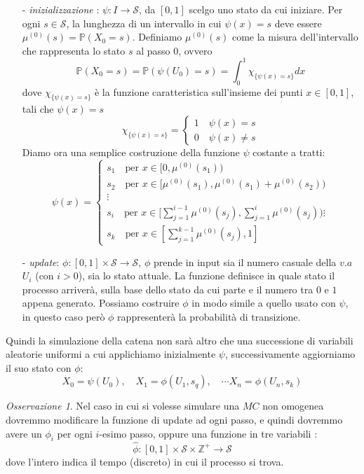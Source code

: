 \documentclass{article}
\theoremstyle{definition}
\theoremstyle{remark}
\newtheorem{remark}[theorem]{Osservazione}
\begin{document}
\begin{itemize}
    \item[-] \textit{inizializzazione} : $\psi : I\to \mathcal{S}$, da $[0,1]$ scelgo uno stato da cui iniziare.
          Per ogni $s\in\mathcal{S}$, la lunghezza di un intervallo in cui $\psi(x)=s$ deve essere $\mu^{(0)}(s) =\mathbb{P}(X_0 = s) $.
          Definiamo $\mu^{(0)}(s)$ come la misura dell'intervallo che rappresenta lo stato $s$ al passo $0$, ovvero
          $$ \mathbb{P}(X_0 = s) = \mathbb{P}(\psi(U_0)=s) = \int_0^1 \chi_{\{\psi(x)=s\}} dx$$
          dove $\chi_{\{\psi(x) = s\}}$ è la funzione caratteristica sull'insieme dei punti  $x\in [0,1]$, tali che $\psi(x) = s$
          $$\chi_{\{\psi(x) = s\}} =\left\{ \begin{array}{cl} 1 \quad \psi(x) = s\\ 0 \quad \psi(x) \neq s\end{array} \right.$$
          Diamo ora una semplice costruzione della funzione $\psi$ costante a tratti:
          $$\psi(x)= \begin{cases}

                  s_1 \quad \text{per $x\in [0,\mu^{(0)}(s_1))$}                             \\
                  s_2 \quad \text{per $x\in [\mu^{(0)}(s_1),\mu^{(0)}(s_1)+\mu^{(0)}(s_2))$} \\
                  \vdots                                                                     \\
                  s_i \quad \text{per $x \in [\sum_{j=1}^{i-1}\mu^{(0)}(s_j),\sum_{j=1}^i\mu^{(0)}(s_j))$}
                  \vdots                                                                     \\
                  s_k \quad \text{per $x\in[\sum_{j=1}^{k-1}\mu^{(0)}(s_j),1]$}
              \end{cases}$$
    \item[-]\textit{update}: $\phi : [0,1]\times\mathcal{S}\to \mathcal{S} $, $\phi$ prende in input sia il numero casuale della $v.a$ $U_i$ (con $i>0$), sia  lo stato attuale.
          La funzione definisce in quale stato il processo arriverà, sulla base dello stato da cui parte e il numero tra $0$ e $1$ appena generato. Possiamo costruire $\phi$ in modo simile
          a quello usato con $\psi$, in questo caso però $\phi$ rappresenterà la probabilità di transizione.
\end{itemize}
Quindi la simulazione della catena non sarà altro che una successione di variabili aleatorie uniformi a cui applichiamo inizialmente $\psi$, successivamente aggiorniamo
il suo stato con $\phi$:
$$X_0 = \psi(U_0),\quad X_1 = \phi(U_1,s_q),\quad  \cdots X_n = \phi(U_n,s_k)$$
\begin{remark}
    Nel caso in cui si volesse simulare una $MC$ non omogenea  dovremmo modificare la funzione di update ad ogni passo, e quindi dovremmo avere un $\phi_i$ per ogni $i$-esimo passo, oppure  una funzione in tre variabili :
    $$\widehat{\phi}:[0,1]\times\mathcal{S}\times \mathbb{Z}^+\to \mathcal{S}$$
    dove l'intero indica il tempo (discreto) in cui il processo si trova.
\end{remark}
\end{document}
